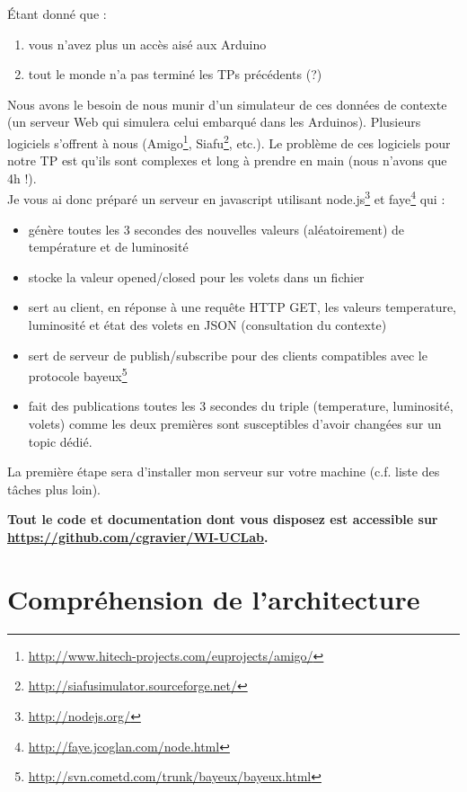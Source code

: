 \documentclass[a4paper,11pt,fleqn]{article}
\begin{document}
\'{E}tant donné que :

\begin{enumerate}
 \item vous n'avez plus un accès aisé aux Arduino
 \item tout le monde n'a pas terminé les TPs précédents (?)
\end{enumerate}

Nous avons le besoin de nous munir d'un simulateur de ces données de contexte (un serveur Web qui simulera celui embarqué dans les Arduinos). Plusieurs logiciels s'offrent à nous (Amigo\footnote{\url{http://www.hitech-projects.com/euprojects/amigo/}}, Siafu\footnote{\url{http://siafusimulator.sourceforge.net/}}, etc.). Le problème de ces logiciels pour notre TP est qu'ils sont complexes et long à prendre en main (nous n'avons que 4h !).\\

Je vous ai donc préparé un serveur en javascript utilisant node.js\footnote{\url{http://nodejs.org/}} et faye\footnote{\url{http://faye.jcoglan.com/node.html}} qui :
	\begin{itemize}
		\item génère toutes les 3 secondes des nouvelles valeurs (aléatoirement) de température et de luminosité
		\item stocke la valeur opened/closed pour les volets dans un fichier
		\item sert au client, en réponse à une requête HTTP GET, les valeurs temperature, luminosité et état des volets en JSON (consultation du contexte)
		\item sert de serveur de publish/subscribe pour des clients compatibles avec le protocole bayeux\footnote{\url{http://svn.cometd.com/trunk/bayeux/bayeux.html}}
		\item fait des publications toutes les 3 secondes du triple (temperature, luminosité, volets) comme les deux premières sont susceptibles d'avoir changées sur un topic dédié.
	\end{itemize}

La première étape sera d'installer mon serveur sur votre machine (c.f. liste des tâches plus loin).

\vspace{1cm}

\textbf{Tout le code et documentation dont vous disposez est accessible sur \url{https://github.com/cgravier/WI-UCLab}.}\\


\section{Compréhension de l'architecture}\label{sec:understand}
\end{document}
